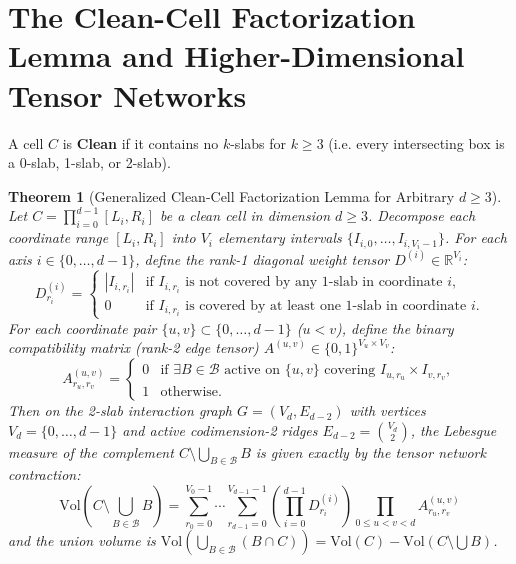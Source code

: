 \documentclass[11pt,a4paper]{article}
\theoremstyle{plain}
\newtheorem{theorem}{Theorem}
\theoremstyle{definition}
\begin{document}
\section{The Clean-Cell Factorization Lemma and Higher-Dimensional Tensor Networks}

A cell $C$ is \textbf{Clean} if it contains no $k$-slabs for $k \ge 3$ (i.e. every intersecting box is a 0-slab, 1-slab, or 2-slab).

\begin{theorem}[Generalized Clean-Cell Factorization Lemma for Arbitrary $d \ge 3$]
Let $C = \prod_{i=0}^{d-1} [L_i, R_i]$ be a clean cell in dimension $d \ge 3$. Decompose each coordinate range $[L_i, R_i]$ into $V_i$ elementary intervals $\{I_{i, 0}, \dots, I_{i, V_i-1}\}$. For each axis $i \in \{0, \dots, d-1\}$, define the rank-1 diagonal weight tensor $D^{(i)} \in \mathbb{R}^{V_i}$:
\[
D^{(i)}_{r_i} = \begin{cases} |I_{i, r_i}| & \text{if } I_{i, r_i} \text{ is not covered by any 1-slab in coordinate } i, \\ 0 & \text{if } I_{i, r_i} \text{ is covered by at least one 1-slab in coordinate } i. \end{cases}
\]
For each coordinate pair $\{u, v\} \subset \{0, \dots, d-1\}$ ($u < v$), define the binary compatibility matrix (rank-2 edge tensor) $A^{(u, v)} \in \{0, 1\}^{V_u \times V_v}$:
\[
A^{(u, v)}_{r_u, r_v} = \begin{cases} 0 & \text{if } \exists B \in \mathcal{B} \text{ active on } \{u, v\} \text{ covering } I_{u, r_u} \times I_{v, r_v}, \\ 1 & \text{otherwise.} \end{cases}
\]
Then on the 2-slab interaction graph $G = (V_d, E_{d-2})$ with vertices $V_d = \{0, \dots, d-1\}$ and active codimension-2 ridges $E_{d-2} = \binom{V_d}{2}$, the Lebesgue measure of the complement $C \setminus \bigcup_{B \in \mathcal{B}} B$ is given exactly by the tensor network contraction:
\begin{equation}
\mathrm{Vol}\left(C \setminus \bigcup_{B \in \mathcal{B}} B\right) = \sum_{r_0=0}^{V_0-1} \cdots \sum_{r_{d-1}=0}^{V_{d-1}-1} \left( \prod_{i=0}^{d-1} D^{(i)}_{r_i} \right) \prod_{0 \le u < v < d} A^{(u, v)}_{r_u, r_v}
\end{equation}
and the union volume is $\mathrm{Vol}(\bigcup_{B \in \mathcal{B}} (B \cap C)) = \mathrm{Vol}(C) - \mathrm{Vol}(C \setminus \bigcup B)$.
\end{theorem}
\end{document}

